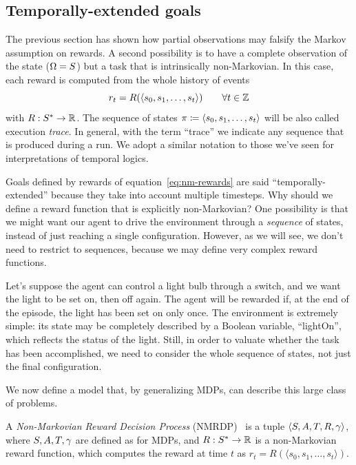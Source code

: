 \subsection{Temporally-extended goals}

The previous section has shown how partial observations may falsify the Markov
assumption on rewards. A second possibility is to have a complete observation
of the state ($\Omega = S$) but a task that is intrinsically
non-Markovian. In this case, each reward is computed from the whole history
of events
\begin{equation}
	r_t = R(\langle s_0, s_1, \dots, s_t \rangle) \qquad \forall t \in \mathbb{Z}
	\label{eq:nm-rewards}
\end{equation}
with $R: S^* \to \mathbb{R}$. The sequence of states $\pi
\coloneqq \langle s_0, s_1, \dots, s_t \rangle$ will be also called
execution \emph{trace}. In general, with the term ``trace'' we indicate any
sequence that is produced during a run. We adopt a similar notation to those
we've seen for interpretations of temporal logics.

Goals defined by rewards of equation~\eqref{eq:nm-rewards} are said
``temporally-extended'' because they take into account multiple timesteps. Why
should we define a reward function that is explicitly non-Markovian? One
possibility is that we might want our agent to drive the environment through a
\emph{sequence} of states, instead of just reaching a single configuration.
However, as we will see, we don't need to restrict to sequences, because we
may define very complex reward functions.

\begin{example}
	Let's suppose the agent can control a light bulb through a switch, and we
	want the light to be set on, then off again. The agent will be rewarded if,
	at the end of the episode, the light has been set on only once.  The
	environment is extremely simple: its state may be completely described by a
	Boolean variable, ``lightOn'', which reflects the status of the light.
	Still, in order to valuate whether the task has been accomplished, we need
	to consider the whole sequence of states, not just the final configuration.
\end{example}

We now define a model that, by generalizing MDPs, can describe this large
class of problems.
\begin{definition}
	A \emph{Non-Markovian Reward Decision Process}
	(NMRDP)~\cite{bib:nmrdp-logic-first} is a tuple $\langle S, A, T, R,
	\gamma \rangle$, where $S, A, T, \gamma$ are defined as for
	MDPs, and $R: S^* \to \mathbb{R}$ is a non-Markovian reward function, which
	computes the reward at time $t$ as $r_t = R(\langle s_0, s_1, \dots, s_t
	\rangle)$.
\end{definition}

